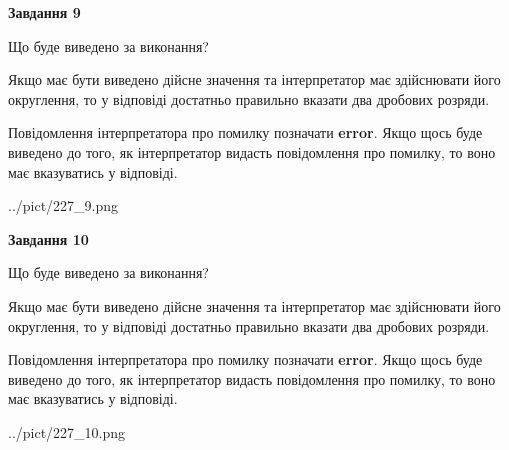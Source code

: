 \documentclass[12pt, ukrainian]{article}
\begin{document}
{\begin {Large}
{\begin {center}\textbf{Завдання 9}\end {center}}\par
Що буде виведено за виконання? \par

Якщо має бути виведено дійсне значення та інтерпретатор має здійснювати його округлення, 
то у відповіді достатньо правильно вказати два дробових розряди.

Повідомлення інтерпретатора про помилку позначати \textbf{error}.
Якщо щось буде виведено до того, як інтерпретатор видасть повідомлення про помилку, 
то воно має вказуватись у відповіді. \par

\begin{center}
	{../pict/227_9.png}
\end{center}
\newpage

{\begin {center}\textbf{Завдання 10}\end {center}}\par
Що буде виведено за виконання? \par

Якщо має бути виведено дійсне значення та інтерпретатор має здійснювати його округлення, 
то у відповіді достатньо правильно вказати два дробових розряди.

Повідомлення інтерпретатора про помилку позначати \textbf{error}.
Якщо щось буде виведено до того, як інтерпретатор видасть повідомлення про помилку, 
то воно має вказуватись у відповіді. \par

\begin{center}
	{../pict/227_10.png}
\end{center}
\newpage

\end {Large}}
\end{document}

